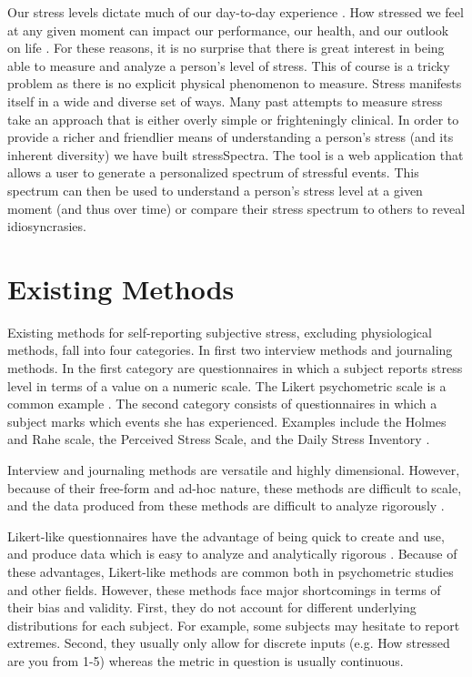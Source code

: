 \documentclass{sigchi}
\begin{document}
Our stress levels dictate much of our day-to-day experience \cite{kanner1981comparison} \cite{levy1997relationship}. How stressed we feel at any given moment can impact our performance, our health, and our outlook on life \cite{delongis1988impact} \cite{bolger1989effects}. For these reasons, it is no surprise that there is great interest in being able to measure and analyze a person's level of stress. This of course is a tricky problem as there is no explicit physical phenomenon to measure. Stress manifests itself in a wide and diverse set of ways. Many past attempts to measure stress take an approach that is either overly simple or frighteningly clinical. In order to provide a richer and friendlier means of understanding a person's stress (and its inherent diversity) we have built stressSpectra. The tool is a web application that allows a user to generate a personalized spectrum of stressful events. This spectrum can then be used to understand a person's stress level at a given moment (and thus over time) or compare their stress spectrum to others to reveal idiosyncrasies. 


\section{Existing Methods}
Existing methods for self-reporting subjective stress, excluding physiological methods, fall into four categories. In first two interview methods and journaling methods. In the first category are questionnaires in which a subject reports stress level in terms of a value on a numeric scale. The Likert psychometric scale is a common example \cite{maurer1998comparison}. The second category consists of questionnaires in which a subject marks which events she has experienced. Examples include the Holmes and Rahe scale, the Perceived Stress Scale, and the Daily Stress Inventory \cite{CSHSquestionnaires} \cite{holmes1967social} \cite{brantley1988convergence}. 

Interview and journaling methods are versatile and highly dimensional. However, because of their free-form and ad-hoc nature, these methods are difficult to scale, and the data produced from these methods are difficult to analyze rigorously \cite{howtomeasureinhumans}.

Likert-like questionnaires have the advantage of being quick to create and use, and produce data which is easy to analyze and analytically rigorous \cite{bland1997statistics}. Because of these advantages, Likert-like methods are common both in psychometric studies and other fields. However, these methods face major shortcomings in terms of their bias and validity. First, they do not account for different underlying distributions for each subject. For example, some subjects may hesitate to report extremes. Second, they usually only allow for discrete inputs (e.g. How stressed are you from 1-5) whereas the metric in question is usually continuous.
\end{document}

